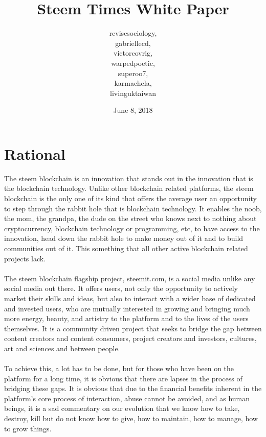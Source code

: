\documentclass[a4paper,12pt]{article}
\newcommand{\sectionbreak}{\clearpage}
\begin{document}
\title{Steem Times White Paper}

\author{revisesociology,\\ gabriellecd,\\ victorcovrig,\\ warpedpoetic,\\ superoo7,\\ karmachela,\\ livinguktaiwan}
\date{June 8, 2018}
\maketitle
\sectionbreak
\section{Rational}
The steem blockchain is an innovation that stands out in the innovation that is the blockchain technology. Unlike other blockchain related platforms, the steem blockchain is the only one of its kind that offers the average user an opportunity to step through the rabbit hole that is blockchain technology. It enables the noob, the mom, the grandpa, the dude on the street who knows next to nothing about cryptocurrency, blockchain technology or programming, etc, to have access to the innovation, head down the rabbit hole to make money out of it and to build communities out of it. This something that all other active blockchain related projects lack.
\\\\
The steem blockchain flagship project, steemit.com, is a social media unlike any social media out there. It offers users, not only the opportunity to actively market their skills and ideas, but also to interact with a wider base of dedicated and invested users, who are mutually interested in growing and bringing much more energy, beauty, and artistry to the platform and to the lives of the users themselves. It is a community driven project that seeks to bridge the gap between content creators and content consumers, project creators and investors, cultures, art and sciences and between people.
\\\\
To achieve this, a lot has to be done, but for those who have been on the platform for a long time, it is obvious that there are lapses in the process of bridging these gaps. It is obvious that due to the financial benefits inherent in the platform’s core process of interaction, abuse cannot be avoided, and as human beings, it is a sad commentary on our evolution that we know how to take, destroy, kill but do not know how to give, how to maintain, how to manage, how to grow things. 
\end{document}

